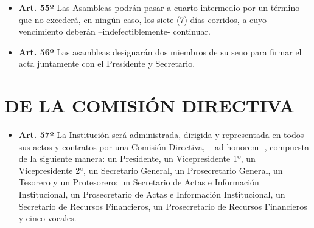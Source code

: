 \documentclass[]{book}
\providecommand{\tightlist}{%
  \setlength{\itemsep}{0pt}\setlength{\parskip}{0pt}}
\begin{document}
\begin{itemize}
\tightlist
\item
  \textbf{Art. 55º} Las Asambleas podrán pasar a cuarto intermedio por
  un término que no excederá, en ningún caso, los siete (7) días
  corridos, a cuyo vencimiento deberán --indefectiblemente- continuar.
\end{itemize}

\begin{itemize}
\tightlist
\item
  \textbf{Art. 56º} Las asambleas designarán dos miembros de su seno
  para firmar el acta juntamente con el Presidente y Secretario.
\end{itemize}

\chapter{DE LA COMISIÓN DIRECTIVA}\label{cap7}

\begin{itemize}
\tightlist
\item
  \textbf{Art. 57º} La Institución será administrada, dirigida y
  representada en todos sus actos y contratos por una Comisión
  Directiva, -- ad honorem -, compuesta de la siguiente manera: un
  Presidente, un Vicepresidente 1º, un Vicepresidente 2º, un Secretario
  General, un Prosecretario General, un Tesorero y un Protesorero; un
  Secretario de Actas e Información Institucional, un Prosecretario de
  Actas e Información Institucional, un Secretario de Recursos
  Financieros, un Prosecretario de Recursos Financieros y cinco vocales.
\end{itemize}
\end{document}
